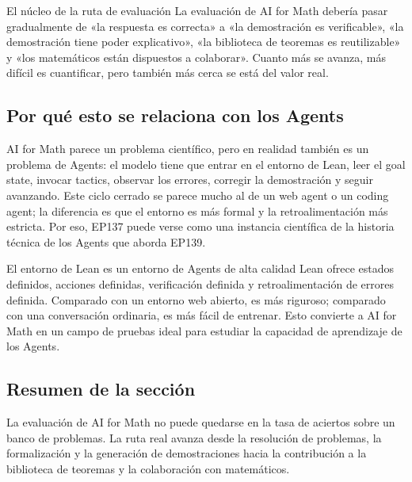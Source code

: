 \begin{importantbox}{El núcleo de la ruta de evaluación}
La evaluación de AI for Math debería pasar gradualmente de «la respuesta es correcta» a «la demostración es verificable», «la demostración tiene poder explicativo», «la biblioteca de teoremas es reutilizable» y «los matemáticos están dispuestos a colaborar». Cuanto más se avanza, más difícil es cuantificar, pero también más cerca se está del valor real.
\end{importantbox}

\subsection{Por qué esto se relaciona con los Agents}

AI for Math parece un problema científico, pero en realidad también es un problema de Agents: el modelo tiene que entrar en el entorno de Lean, leer el goal state, invocar tactics, observar los errores, corregir la demostración y seguir avanzando. Este ciclo cerrado se parece mucho al de un web agent o un coding agent; la diferencia es que el entorno es más formal y la retroalimentación más estricta. Por eso, EP137 puede verse como una instancia científica de la historia técnica de los Agents que aborda EP139.

\begin{knowledgebox}{El entorno de Lean es un entorno de Agents de alta calidad}
Lean ofrece estados definidos, acciones definidas, verificación definida y retroalimentación de errores definida. Comparado con un entorno web abierto, es más riguroso; comparado con una conversación ordinaria, es más fácil de entrenar. Esto convierte a AI for Math en un campo de pruebas ideal para estudiar la capacidad de aprendizaje de los Agents.
\end{knowledgebox}

\subsection{Resumen de la sección}

La evaluación de AI for Math no puede quedarse en la tasa de aciertos sobre un banco de problemas. La ruta real avanza desde la resolución de problemas, la formalización y la generación de demostraciones hacia la contribución a la biblioteca de teoremas y la colaboración con matemáticos.

